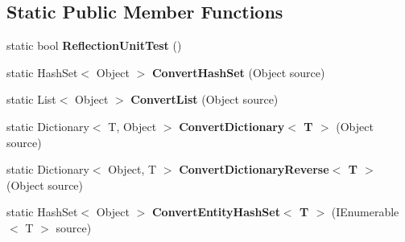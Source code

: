 \subsection*{Static Public Member Functions}
\begin{DoxyCompactItemize}
\item 
\hypertarget{class_s_e_mod_a_p_i_internal_1_1_a_p_i_1_1_utility_1_1_utility_functions_a0585b5643196a92d8471361ff01cb2e3}{}static bool {\bfseries Reflection\+Unit\+Test} ()\label{class_s_e_mod_a_p_i_internal_1_1_a_p_i_1_1_utility_1_1_utility_functions_a0585b5643196a92d8471361ff01cb2e3}

\item 
\hypertarget{class_s_e_mod_a_p_i_internal_1_1_a_p_i_1_1_utility_1_1_utility_functions_ac351039907e72688b7f56145ea031af4}{}static Hash\+Set$<$ Object $>$ {\bfseries Convert\+Hash\+Set} (Object source)\label{class_s_e_mod_a_p_i_internal_1_1_a_p_i_1_1_utility_1_1_utility_functions_ac351039907e72688b7f56145ea031af4}

\item 
\hypertarget{class_s_e_mod_a_p_i_internal_1_1_a_p_i_1_1_utility_1_1_utility_functions_a600133e98f475369833d6fa7a6182a4a}{}static List$<$ Object $>$ {\bfseries Convert\+List} (Object source)\label{class_s_e_mod_a_p_i_internal_1_1_a_p_i_1_1_utility_1_1_utility_functions_a600133e98f475369833d6fa7a6182a4a}

\item 
\hypertarget{class_s_e_mod_a_p_i_internal_1_1_a_p_i_1_1_utility_1_1_utility_functions_afcee201ff66f17faa294b508eb6d229e}{}static Dictionary$<$ T, Object $>$ {\bfseries Convert\+Dictionary$<$ T $>$} (Object source)\label{class_s_e_mod_a_p_i_internal_1_1_a_p_i_1_1_utility_1_1_utility_functions_afcee201ff66f17faa294b508eb6d229e}

\item 
\hypertarget{class_s_e_mod_a_p_i_internal_1_1_a_p_i_1_1_utility_1_1_utility_functions_a19f0362f06bb1f567b376a61c1a53366}{}static Dictionary$<$ Object, T $>$ {\bfseries Convert\+Dictionary\+Reverse$<$ T $>$} (Object source)\label{class_s_e_mod_a_p_i_internal_1_1_a_p_i_1_1_utility_1_1_utility_functions_a19f0362f06bb1f567b376a61c1a53366}

\item 
\hypertarget{class_s_e_mod_a_p_i_internal_1_1_a_p_i_1_1_utility_1_1_utility_functions_a2bd2ba05512b34d40c5a4623ad00d53e}{}static Hash\+Set$<$ Object $>$ {\bfseries Convert\+Entity\+Hash\+Set$<$ T $>$} (I\+Enumerable$<$ T $>$ source)\label{class_s_e_mod_a_p_i_internal_1_1_a_p_i_1_1_utility_1_1_utility_functions_a2bd2ba05512b34d40c5a4623ad00d53e}


\end{DoxyCompactItemize}
